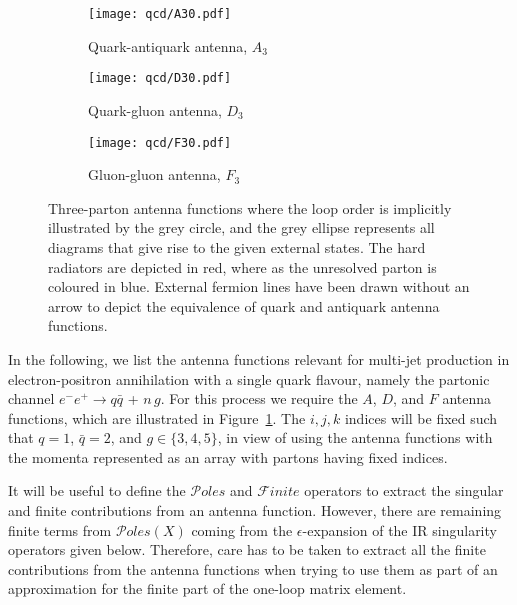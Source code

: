 \documentclass[main.tex]{subfiles}
\begin{document}
    \begin{figure}
        \centering
        \begin{subfigure}{0.4\linewidth}
            \texttt{[image: qcd/A30.pdf]}
            \caption{Quark-antiquark antenna, $A_{3}$}
            \vspace{20pt}
        \end{subfigure}
        \begin{subfigure}{0.4\linewidth}
            \texttt{[image: qcd/D30.pdf]}
            \caption{Quark-gluon antenna, $D_{3}$}
            \vspace{20pt}
        \end{subfigure}
        \begin{subfigure}{0.4\linewidth}
            \texttt{[image: qcd/F30.pdf]}
            \caption{Gluon-gluon antenna, $F_{3}$}
        \end{subfigure}
        \vspace{10pt}
        \caption{Three-parton antenna functions where the loop order
            is implicitly illustrated by the grey circle,
            and the grey ellipse represents all diagrams that give
            rise to the given external states. The hard radiators are
            depicted in red, where as the unresolved parton is coloured
            in blue. External fermion lines have been drawn without
            an arrow to depict the equivalence of quark and antiquark
            antenna functions.}
        \label{fig:antenna}
    \end{figure}

    In the following, we list the antenna functions relevant
    for multi-jet production in electron-positron
    annihilation with a single quark flavour,
    namely the partonic channel $e^{-}e^{+} \rightarrow
    q \bar{q}$ + $n \, g$.
    For this process we require the $A$, $D$, and $F$ antenna functions,
    which are illustrated in Figure~\ref{fig:antenna}.
    The $i,j,k$ indices will be fixed such that $q = 1$, $\bar{q} = 2$,
    and $g \in \{3, 4, 5\}$, in view of using the
    antenna functions with the momenta
    represented as an array with partons having fixed indices.

    It will be useful to define the $\mathcal{P}oles$
    and $\mathcal{F}inite$ operators to extract the
    singular and finite contributions from an antenna
    function. However, there are remaining finite terms
    from $\mathcal{P}oles(X)$ coming from the $\epsilon$-expansion
    of the IR singularity operators given below. Therefore,
    care has to be taken to extract all the finite
    contributions from the antenna functions when trying
    to use them as part of an approximation for the
    finite part of the one-loop matrix element.
\end{document}
